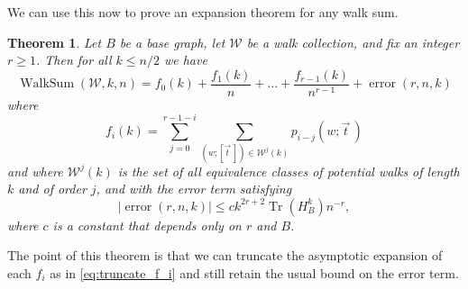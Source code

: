 \documentclass{memo-l}
\theoremstyle{plain}
\theoremstyle{definition}
\numberwithin{section}{chapter}
\numberwithin{equation}{chapter}
\DeclareMathOperator{\WalkSum}{WalkSum}
\DeclareMathOperator{\error}{error}
\DeclareMathOperator{\Tr}{Tr}
\newcommand{\potwalk}{(w;\vec t\,)}
\theoremstyle{plain}
\newtheorem{thm}[theorem]{Theorem}
\theoremstyle{definition}
\newcommand\cW{\mathcal{W}}
\begin{document}
We can use this now to prove an expansion theorem for any walk sum.

\begin{thm}\label{thm:walk_sum_expansion} Let \( B \) be a base graph, let
\( \cW \) be a walk collection, and fix an integer \( r \geq 1 \). Then for
all \( k \leq n/2 \) we have 
\begin{equation}\label{eq:walk_sum_expansion}
\WalkSum(\cW,k,n) = f_0(k) +
\frac{f_1(k)}{n} + \ldots + \frac{f_{r-1}(k)}{n^{r-1}} + \error(r,n,k) 
\end{equation}
where 
\begin{equation}\label{eq:truncate_f_i}
f_i(k) = \sum_{j=0}^{r-1-i} \sum_{(w; [\vec t\,]) \in \cW^j(k)}
\!\!\! p_{i-j} \potwalk 
\end{equation}
and where \( \cW^j(k) \) is the set of all
equivalence classes of potential walks of length \(k\) and of order \(j\),
and
with the error term satisfying 
\begin{equation}\label{eq:error_bound_wse}
| \error(r,n,k) | \leq ck^{2r+2} 
\Tr(H_B^k) 
n^{-r} ,
\end{equation} 
where \(c\) is a constant that depends only on $r$ and $B$.
\end{thm} 
The point of this theorem is that we can truncate the asymptotic
expansion of each $f_i$ as in \eqref{eq:truncate_f_i} and still 
retain the usual bound on the error term.
\end{document}
